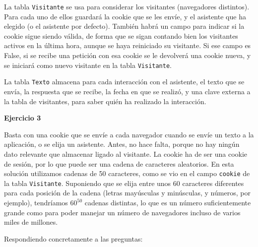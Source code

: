 La tabla \texttt{Visitante} se usa para considerar los visitantes (navegadores distintos). Para cada uno de ellos guardará la cookie que se les envíe, y el asistente que ha elegido (o el asistente por defecto). También habrá un campo para indicar si la cookie sigue siendo válida, de forma que se sigan contando bien los visitantes activos en la última hora, aunque se haya reiniciado su visitante. Si ese campo es False, si se recibe una petición con esa cookie se le devolverá una cookie nueva, y se iniciará como nuevo visitante en la tabla \texttt{Visitante}.

La tabla \texttt{Texto} almacena para cada interacción con el asistente, el texto que se envía, la respuesta que se recibe, la fecha en que se realizó, y una clave externa a la tabla de visitantes, para saber quién ha realizado la interacción.


\textbf{Ejercicio 3}

Basta con una cookie que se envíe a cada navegador cuando se envíe un texto a la aplicación, o se elija un asistente. Antes, no hace falta, porque no hay ningún dato relevante que almacenar ligado al visitante. La cookie ha de ser una cookie de sesión, por lo que puede ser una cadena de caracteres aleatorios. En esta solución utilizamos cadenas de 50 caracteres, como se vio en el campo \texttt{cookie} de la tabla \texttt{Visitante}. Suponiendo que se elija entre unos 60 caracteres diferentes para cada posición de la cadena (letras mayúsculas y minúsculas, y números, por ejemplo), tendríamos $60^{50}$ cadenas distintas, lo que es un número suficientemente grande como para poder manejar un número de navegadores incluso de varios miles de millones.

Respondiendo concretamente a las preguntas:

